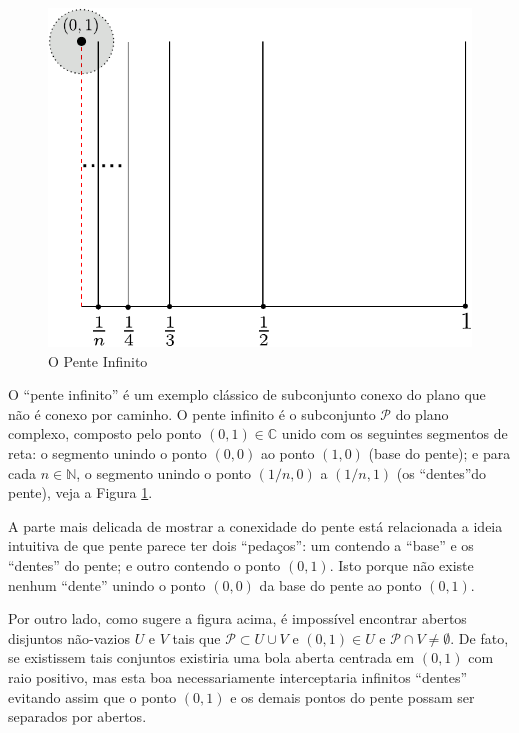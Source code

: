 \begin{figure}[h]
\centering
\includegraphics[scale=0.55]{Figuras/fig-pente}
\caption{O Pente Infinito}
\label{fig-pente}
\end{figure}

O ``pente infinito'' é um exemplo 
clássico de subconjunto conexo do plano que não é conexo por caminho.
O pente infinito é o subconjunto $\mathscr{P}$ do plano complexo, composto pelo ponto $(0,1)\in\mathbb{C}$
unido com os seguintes segmentos de reta: o segmento unindo o ponto $(0,0)$ ao ponto $(1,0)$ (base do pente);
e para cada $n\in\mathbb{N}$, o segmento unindo o ponto $(1/n,0)$ a $(1/n,1)$ (os ``dentes''do pente), 
veja a Figura \ref{fig-pente}.



A parte mais delicada de mostrar a conexidade do pente está relacionada 
a ideia intuitiva de que pente parece ter dois ``pedaços'': um contendo a ``base'' e os 
``dentes'' do pente; e outro contendo o ponto $(0,1)$. Isto porque não existe nenhum ``dente''
unindo o ponto $(0,0)$ da base do pente ao ponto $(0,1)$. 

Por outro lado, como sugere a figura acima, é impossível encontrar abertos disjuntos não-vazios
$U$ e $V$ tais que $\mathscr{P}\subset U\cup V$ e $(0,1)\in U$ e 
$\mathscr{P}\cap V\neq \emptyset$.
De fato, se existissem tais conjuntos existiria uma bola aberta centrada em $(0,1)$ 
com raio positivo, mas esta boa necessariamente interceptaria infinitos ``dentes'' 
evitando assim que o ponto $(0,1)$ e os demais pontos do pente possam ser separados
por abertos.

